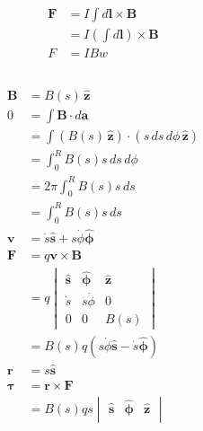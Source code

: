 \documentclass{article}
\renewcommand{\vec}[1]{\boldsymbol{\mathbf{#1}}}
\newcommand{\uvec}[1]{\hat{\vec{#1}}}
\begin{document}
\begin{align*}
  \vec{F} & = I \int d \vec{l} \times \vec{B}                \\
          & = I \left( \int d \vec{l} \right) \times \vec{B} \\
  F       & = I B w
\end{align*}

\subsection{}

\begin{align*}
  \vec{B}    & = B(s) \,\uvec{z}                                            \\
  0          & = \int \vec{B} \cdot d \vec{a}                               \\
             & = \int (B(s) \,\uvec{z}) \cdot (s \,d s \,d \phi \,\uvec{z}) \\
             & = \int_0^R B(s) s \,d s \,d \phi                             \\
             & = 2 \pi \int_0^R B(s) s \,d s                                \\
             & = \int_0^R B(s) s \,d s                                      \\
  \vec{v}    & = \dot{s} \uvec{s} + s \dot{\phi} \uvec{\phi}                \\
  \vec{F}    & = q \vec{v} \times \vec{B}                                   \\
             & = q \begin{vmatrix}
                     \uvec{s} & \uvec{\phi}  & \uvec{z} \\
                     \dot{s}  & s \dot{\phi} & 0        \\
                     0        & 0            & B(s)
                   \end{vmatrix}                       \\
             & = B(s) q (s \dot{\phi} \uvec{s} - \dot{s} \uvec{\phi})       \\
  \vec{r}    & = s \uvec{s}                                                 \\
  \vec{\tau} & = \vec{r} \times \vec{F}                                     \\
             & = B(s) q s \begin{vmatrix}
                            \uvec{s}     & \uvec{\phi} & \uvec{z} \\

\end{vmatrix}
\end{align*}
\end{document}

